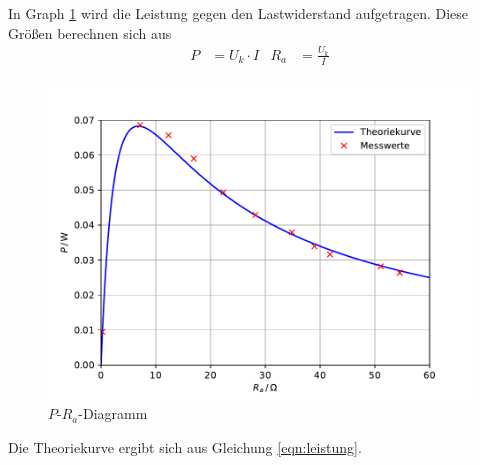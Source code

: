 In Graph \ref{fig:leistung} wird die Leistung gegen den Lastwiderstand aufgetragen.
Diese Größen berechnen sich aus
\begin{align}
  P &= U_k \cdot I & R_a &= \frac{U_k}{I}
\end{align}
\begin{figure}[H]
  \centering
  \includegraphics[width=\textwidth]{Plots/leistung.pdf}
  \caption{$P$-$R_a$-Diagramm}
  \label{fig:leistung}
\end{figure}

Die Theoriekurve ergibt sich aus Gleichung \eqref{eqn:leistung}.
